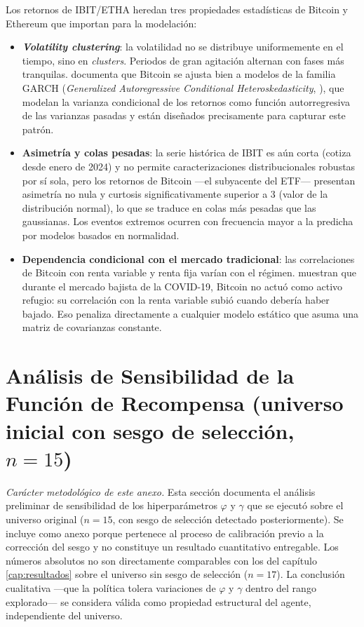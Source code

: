 \documentclass[IB,a4paper]{TFUOC}
\begin{document}
\noindent Los retornos de IBIT/ETHA heredan tres propiedades estadísticas de Bitcoin y Ethereum que importan para la modelación:

\begin{itemize}
    \item \textbf{\textit{Volatility clustering}}: la volatilidad no se distribuye uniformemente en el tiempo, sino en \textit{clusters}. Periodos de gran agitación alternan con fases más tranquilas. \citet{katsiampa2017} documenta que Bitcoin se ajusta bien a modelos de la familia GARCH (\textit{Generalized Autoregressive Conditional Heteroskedasticity}, \citet{bollerslev1986garch}), que modelan la varianza condicional de los retornos como función autorregresiva de las varianzas pasadas y están diseñados precisamente para capturar este patrón.
    \item \textbf{Asimetría y colas pesadas}: la serie histórica de IBIT es aún corta (cotiza desde enero de 2024) y no permite caracterizaciones distribucionales robustas por sí sola, pero los retornos de Bitcoin —el subyacente del ETF— presentan asimetría no nula y curtosis significativamente superior a 3 (valor de la distribución normal), lo que se traduce en colas más pesadas que las gaussianas. Los eventos extremos ocurren con frecuencia mayor a la predicha por modelos basados en normalidad.
    \item \textbf{Dependencia condicional con el mercado tradicional}: las correlaciones de Bitcoin con renta variable y renta fija varían con el régimen. \citet{conlon2020safehaven} muestran que durante el mercado bajista de la COVID-19, Bitcoin no actuó como activo refugio: su correlación con la renta variable subió cuando debería haber bajado. Eso penaliza directamente a cualquier modelo estático que asuma una matriz de covarianzas constante.
\end{itemize}

\chapter{Análisis de Sensibilidad de la Función de Recompensa (universo inicial con sesgo de selección, $n=15$)}
\label{sec:resultados_sensitivity}

\noindent\textit{Carácter metodológico de este anexo.} Esta sección documenta el análisis preliminar de sensibilidad de los hiperparámetros $\varphi$ y $\gamma$ que se ejecutó sobre el universo original ($n=15$, con sesgo de selección detectado posteriormente). Se incluye como anexo porque pertenece al proceso de calibración previo a la corrección del sesgo y no constituye un resultado cuantitativo entregable. Los números absolutos no son directamente comparables con los del capítulo \ref{cap:resultados} sobre el universo sin sesgo de selección ($n=17$). La conclusión cualitativa ---que la política tolera variaciones de $\varphi$ y $\gamma$ dentro del rango explorado--- se considera válida como propiedad estructural del agente, independiente del universo.
\end{document}
